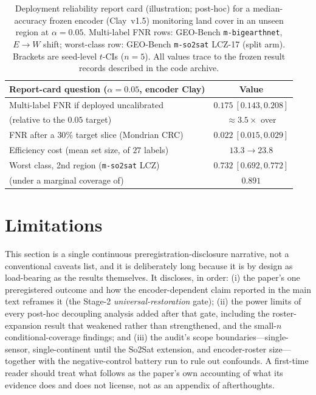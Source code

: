 \documentclass[journal]{IEEEtran}
\renewcommand{\_}{\textunderscore\allowbreak}
\begin{document}
\begin{table}[!t]\centering\small
\caption{Deployment reliability report card (illustration; post-hoc) for a median-accuracy frozen encoder
(Clay~v1.5) monitoring land cover in an unseen region at $\alpha{=}0.05$. Multi-label FNR rows: GEO-Bench
\texttt{m-bigearthnet}, $E\!\to\!W$ shift; worst-class row: GEO-Bench \texttt{m-so2sat} LCZ-17 (split arm).
Brackets are seed-level $t$-CIs ($n{=}5$). All values trace to the frozen result
records described in the code archive.}\label{tab:reportcard}
\begin{tabular}{@{}lc@{}}
\toprule
Report-card question ($\alpha{=}0.05$, encoder Clay) & Value \\
\midrule
Multi-label FNR if deployed uncalibrated & $0.175\ [0.143,0.208]$ \\
\quad(relative to the $0.05$ target) & ${\approx}3.5\times$ over \\
FNR after a $30\%$ target slice (Mondrian CRC) & $0.022\ [0.015,0.029]$ \\
Efficiency cost (mean set size, of $27$ labels) & $13.3\to23.8$ \\
Worst class, 2nd region (\texttt{m-so2sat} LCZ) & $0.732\ [0.692,0.772]$ \\
\quad(under a marginal coverage of) & $0.891$ \\
\bottomrule
\end{tabular}
\end{table}

\section{Limitations}\label{sec:limitations}
This section is a single continuous preregistration-disclosure narrative, not a conventional caveats
list, and it is deliberately long because it is by design as load-bearing as the results themselves. It
discloses, in order: (i) the paper's one preregistered outcome and how the encoder-dependent claim
reported in the main text reframes it (the Stage-2 \emph{universal-restoration} gate); (ii) the power
limits of every post-hoc decoupling analysis added after that gate, including the roster-expansion result
that weakened rather than strengthened, and the small-$n$ conditional-coverage findings; and (iii) the
audit's scope boundaries---single-sensor, single-continent until the So2Sat extension, and encoder-roster
size---together with the negative-control battery run to rule out confounds. A first-time reader should
treat what follows as the paper's own accounting of what its evidence does and does not license, not as
an appendix of afterthoughts.
\end{document}
